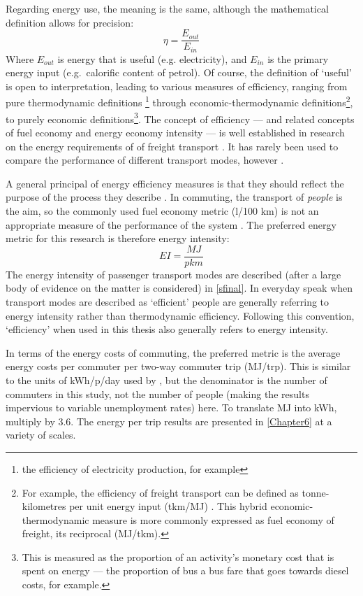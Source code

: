 \begin{itemize}
Regarding energy use, the meaning is the same, although the mathematical
definition allows for precision:
\begin{equation}
 \eta = \frac{E_{out}}{E_{in}}
\end{equation}
Where $E_{out}$ is energy that is useful (e.g. electricity), and $E_{in}$ is
the primary energy input (e.g.\ calorific content of petrol). Of course, the
definition of `useful' is open to interpretation\citep{Patterson1996}, leading
to various measures of efficiency, ranging from pure thermodynamic definitions
\footnote{the efficiency of electricity production, for example} through
economic-thermodynamic definitions\footnote{For example, the efficiency of
freight transport can be defined as tonne-kilometres per unit energy input
(tkm/MJ) \citep{Simongati2010}. This hybrid economic-thermodynamic measure is
more commonly expressed as fuel economy of freight, its reciprocal
(MJ/tkm).},
to purely economic definitions\footnote{This is measured as the proportion of
an activity's monetary cost that is spent on energy --- the proportion of bus a
bus fare that goes towards diesel costs, for example.}. The concept of
efficiency --- and related concepts of fuel economy and energy economy
intensity --- is well established in research on the energy requirements of
of freight transport \citep{Kamakate2009}. It has rarely been used to compare
the performance of different transport modes, however \citep{Fels1975,
Lovelace2011-assessing}.

A general principal of energy efficiency measures is that they should reflect
the purpose of the process they describe \citep{Patterson1996}. In commuting,
the transport of \emph{people} is the aim, so the commonly used fuel economy
metric (l/100 km) is not an appropriate measure of the  performance of the
system \citep{MacKay2009}. The preferred energy metric for this research is
therefore energy intensity:
\begin{equation}
 EI = \frac{MJ}{pkm}
\end{equation}
The energy intensity of passenger transport modes are described
(after a large body of evidence on the matter is considered) in \cref{sfinal}.
In everyday speak when transport modes are described as `efficient' people
are generally referring to energy intensity rather than thermodynamic
efficiency. Following this convention, `efficiency' when used in this thesis
also generally refers to energy intensity.

In terms of the energy costs of commuting, the preferred metric is the average
energy costs per commuter per two-way commuter trip (MJ/trp).
This is similar to the units of kWh/p/day used by \citet{Boussauw2009},
but the denominator is the number of commuters in this study, not the number
of people (making the results impervious to variable unemployment rates) here.
To translate MJ into kWh, multiply by 3.6.
The energy per trip results are presented in \cref{Chapter6} at a variety of scales.


\end{itemize}
